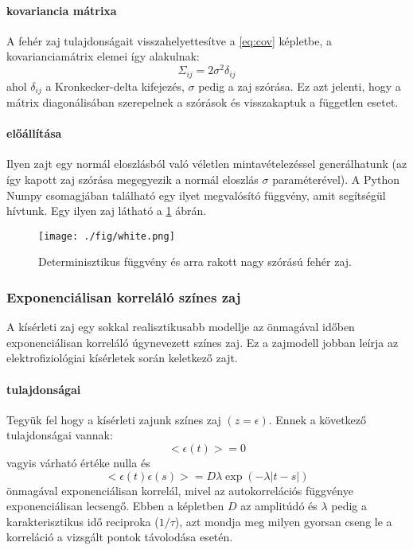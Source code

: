 \paragraph{kovariancia mátrixa}
A fehér zaj tulajdonságait visszahelyettesítve a \ref{eq:cov} képletbe, a kovarianciamátrix elemei így alakulnak:
\begin{equation}
\Sigma_{ij} = 2\sigma^2 \delta_{ij}
\end{equation}
ahol $\delta_{ij}$ a Kronkecker-delta kifejezés, $\sigma$ pedig a zaj szórása. Ez azt jelenti, hogy a mátrix diagonálisában szerepelnek a szórások és visszakaptuk a független esetet.

\paragraph{előállítása}
Ilyen zajt egy normál eloszlásból való véletlen mintavételezéssel generálhatunk (az így kapott zaj szórása megegyezik a normál eloszlás $\sigma$ paraméterével). A Python Numpy csomagjában található egy ilyet megvalósító függvény, amit segítségül hívtunk. Egy ilyen zaj látható a \ref{fig:white} ábrán.

\begin{figure}[!htb]
	\centering
	\texttt{[image: ./fig/white.png]}
	\caption[Fehér zaj]{Determinisztikus függvény és arra rakott nagy szórású fehér zaj.}
	\label{fig:white}
\end{figure}


\FloatBarrier
\subsubsection{Exponenciálisan korreláló színes zaj}
A kísérleti zaj egy sokkal realisztikusabb modellje az önmagával időben exponenciálisan korreláló úgynevezett színes zaj. Ez a zajmodell jobban leírja az elektrofiziológiai kísérletek során keletkező zajt. 

\paragraph{tulajdonságai}
Tegyük fel hogy a kísérleti zajunk színes zaj $(z = \epsilon)$. Ennek a következő tulajdonságai vannak:
\begin{equation}
<\epsilon(t)> = 0
\end{equation}
vagyis várható értéke nulla és
\begin{equation}
<\epsilon(t)\epsilon(s)> = D\lambda \exp(-\lambda|t-s|)
\end{equation}
önmagával exponenciálisan korrelál, mivel az autokorrelációs függvénye exponenciálisan lecsengő. Ebben a képletben $D$ az amplitúdó és $\lambda$ pedig a karakterisztikus idő reciproka ($1/\tau$), azt mondja meg milyen gyorsan cseng le a korreláció a vizsgált pontok távolodása esetén. 

